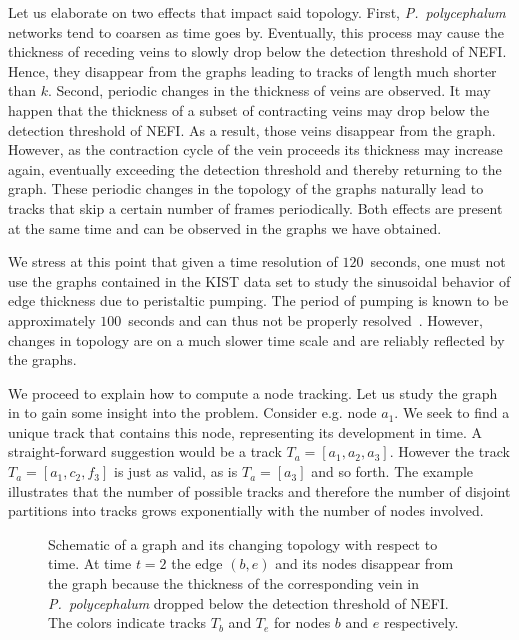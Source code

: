 	      Let us elaborate on two effects that impact said topology. First, \emph{P.~polycephalum} networks tend to coarsen as time goes by. Eventually, this process may cause the thickness of receding veins to slowly drop below the detection threshold of NEFI. Hence, they disappear from the graphs leading to tracks of length much shorter than $k$. Second, periodic changes in the thickness of veins are observed. It may happen that the thickness of a subset of contracting veins may drop below the detection threshold of NEFI. As a result, those veins disappear from the graph. However, as the contraction cycle of the vein proceeds its thickness may increase again, eventually exceeding the detection threshold and thereby returning to the graph. These periodic changes in the topology of the graphs naturally lead to tracks that skip a certain number of frames periodically. Both effects are present at the same time and can be observed in the graphs we have obtained.

	      We stress at this point that given a time resolution of $120$~seconds, one must not use the graphs contained in the KIST data set to study the sinusoidal behavior of edge thickness due to peristaltic pumping. The period of pumping is known to be approximately $100$~seconds and can thus not be properly resolved~\cite{stewart1959protoplasmic}. However, changes in topology are on a much slower time scale and are reliably reflected by the graphs.

	      We proceed to explain how to compute a node tracking. Let us study the graph in  to gain some insight into the problem. Consider e.g. node $a_1$. We seek to find a unique track that contains this node, representing its development in time. A straight-forward suggestion would be a track $T_a = [a_1,a_2,a_3]$. However the track $T_a = [a_1,c_2,f_3]$ is just as valid, as is $T_a = [a_3]$ and so forth. The example illustrates that the number of possible tracks and therefore the number of disjoint partitions into tracks grows exponentially with the number of nodes involved. 


	      \begin{figure}
	        
	        
	        
	        \caption[Schematic description of node tracking.]{Schematic of a graph and its changing topology with respect to time. At time $t=2$ the edge $(b,e)$ and its nodes disappear from the graph because the thickness of the corresponding vein in \emph{P.~polycephalum} dropped below the detection threshold of NEFI. The colors indicate tracks $T_b$ and $T_e$ for nodes $b$ and $e$ respectively.}
	        \label{fig:tracking}
	      \end{figure}

